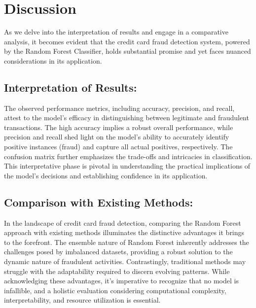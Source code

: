 \let\cleardoublepage\clearpage
\chapter{Discussion} %

\label{Chapter5} %


\newcommand{\keyword}[1]{\textbf{#1}}
\newcommand{\tabhead}[1]{\textbf{#1}}
\newcommand{\code}[1]{\texttt{#1}}
\newcommand{\file}[1]{\texttt{\bfseries#1}}
\newcommand{\option}[1]{\texttt{\itshape#1}}


As we delve into the interpretation of results and engage in a comparative analysis, it becomes evident that the credit card fraud detection system, powered by the Random Forest Classifier, holds substantial promise and yet faces nuanced considerations in its application.

\section{Interpretation of Results:}
The observed performance metrics, including accuracy, precision, and recall, attest to the model's efficacy in distinguishing between legitimate and fraudulent transactions. The high accuracy implies a robust overall performance, while precision and recall shed light on the model's ability to accurately identify positive instances (fraud) and capture all actual positives, respectively. The confusion matrix further emphasizes the trade-offs and intricacies in classification. This interpretative phase is pivotal in understanding the practical implications of the model's decisions and establishing confidence in its application.

\section{Comparison with Existing Methods:}
In the landscape of credit card fraud detection, comparing the Random Forest approach with existing methods illuminates the distinctive advantages it brings to the forefront. The ensemble nature of Random Forest inherently addresses the challenges posed by imbalanced datasets, providing a robust solution to the dynamic nature of fraudulent activities. Contrastingly, traditional methods may struggle with the adaptability required to discern evolving patterns. While acknowledging these advantages, it's imperative to recognize that no model is infallible, and a holistic evaluation considering computational complexity, interpretability, and resource utilization is essential.\medskip

